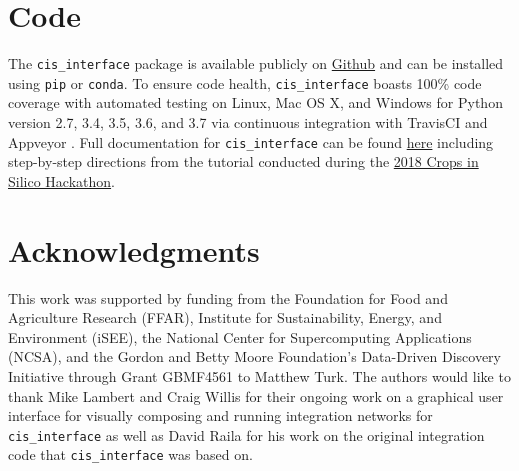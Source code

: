 \documentclass[journal]{IEEEtran}
\newcommand{\todo}[1]{{\color{red}{#1}}}
\newcommand{\cis}{{\tt cis\_interface}{}}
\begin{document}
\section*{Code}\label{S:code}
The {\cis} package is available publicly on \href{https://github.com/cropsinsilico/cis_interface}{Github} and can be 
installed using {\tt pip} or {\tt conda}. To ensure code health, {\cis} boasts 100\% code coverage with automated testing on Linux, Mac OS X, and Windows for Python version 2.7, 3.4, 3.5, 3.6, and 3.7 via continuous integration with TravisCI \citep{travisci} and Appveyor \citep{appveyor}. Full documentation for {\cis} can be found \href{https://cropsinsilico.github.io/cis_interface/}{here} including step-by-step directions from the tutorial conducted during the \href{https://cropsinsilico.github.io/cis_interface/hackathon2018/index.html}{2018 Crops in Silico Hackathon}.


\section*{Acknowledgments}
\ifieee
\else
\acknowledgments
\fi
%
This work was supported by funding from the Foundation for Food and Agriculture Research (FFAR), Institute for Sustainability, Energy, and Environment (iSEE), the National Center for Supercomputing Applications (NCSA), and the Gordon and Betty Moore Foundation's Data-Driven Discovery Initiative through Grant GBMF4561 to Matthew Turk. 
%
The authors would like to thank Mike Lambert and Craig Willis for their ongoing work on a graphical user interface for visually composing and running integration networks for {\cis} as well as David Raila for his work on the original integration code that {\cis} was based on.
\end{document}
